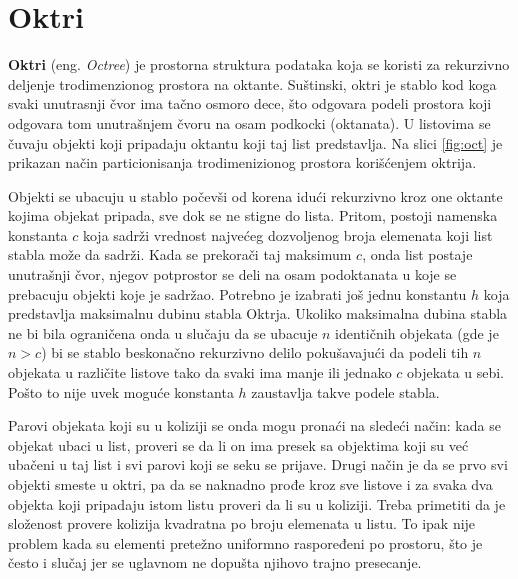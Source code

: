 \documentclass[12pt,oneside]{memoir}
\begin{document}
\section{Oktri}
\label{subsec:octree}

\textbf{Oktri} (eng. {\em Octree}) je prostorna struktura podataka koja se koristi za rekurzivno deljenje trodimenzionog prostora na oktante.
Suštinski, oktri je stablo kod koga svaki unutrasnji čvor ima tačno osmoro dece,
što odgovara podeli prostora koji odgovara tom unutrašnjem čvoru na osam podkocki (oktanata).
U listovima se čuvaju objekti koji pripadaju oktantu koji taj list predstavlja.
Na slici \ref{fig:oct} je prikazan način particionisanja trodimenizionog prostora korišćenjem oktrija.

Objekti se ubacuju u stablo počevši od korena idući rekurzivno kroz one oktante kojima objekat pripada,
sve dok se ne stigne do lista.
Pritom, postoji namenska konstanta $c$ koja sadrži vrednost najvećeg dozvoljenog broja elemenata koji list stabla može da sadrži.
Kada se prekorači taj maksimum $c$, onda list postaje unutrašnji čvor, njegov potprostor se deli 
na osam podoktanata u koje se prebacuju objekti koje je sadržao.
Potrebno je izabrati još jednu konstantu $h$ koja predstavlja maksimalnu dubinu stabla Oktrja.
Ukoliko maksimalna dubina stabla ne bi bila ograničena onda u slučaju da se ubacuje $n$ identičnih objekata (gde je $n > c$) bi se stablo 
beskonačno rekurzivno delilo pokušavajući da podeli tih $n$ objekata u različite listove 
tako da svaki ima manje ili jednako $c$ objekata u sebi. 
Pošto to nije uvek moguće konstanta $h$ zaustavlja takve podele stabla.

Parovi objekata koji su u koliziji se onda mogu pronaći na sledeći način:
kada se objekat ubaci u list, proveri se da li on ima presek sa objektima koji su već
ubačeni u taj list i svi parovi koji se seku se prijave.
Drugi način je da se prvo svi objekti smeste u oktri, 
pa da se naknadno prođe kroz sve listove i za svaka dva objekta koji pripadaju istom listu proveri da li su u koliziji.
Treba primetiti da je složenost provere kolizija kvadratna po broju elemenata u listu.
To ipak nije problem kada su elementi pretežno uniformno raspoređeni po prostoru, što je često 
i slučaj jer se uglavnom ne dopušta njihovo trajno presecanje. 
\end{document}
